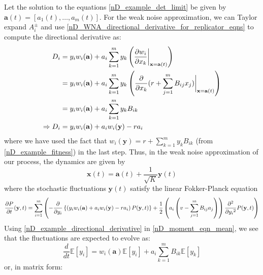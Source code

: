 Let the solution to the equations \eqref{nD_example_det_limit} be given by $\mathbf{a}(t) = [a_1(t),\ldots,a_m(t)]$. For the weak noise approximation, we can Taylor expand $A^{\pm}_i$ and use \eqref{nD_WNA_directional_derivative_for_replicator_eqns} to compute the directional derivative as:
\begin{align}
D_i &= y_iw_i(\mathbf{a}) + a_i\sum\limits_{k=1}^{m}y_k\left(\frac{\partial w_i}{\partial x_k}\bigg{|}_{\mathbf{x}=\mathbf{a}(t)}\right)\\
&= y_iw_i(\mathbf{a}) + a_i\sum\limits_{k=1}^{m}y_k\left(\frac{\partial}{\partial x_k}(r+\sum\limits_{j=1}^{m}B_{ij}x_j)\bigg{|}_{\mathbf{x}=\mathbf{a}(t)}\right)\\
&= y_iw_i(\mathbf{a}) + a_i\sum\limits_{k=1}^{m}y_kB_{ik}\\
\Rightarrow D_i &= y_iw_i(\mathbf{a}) + a_iw_i(\mathbf{y}) - ra_i\label{nD_example_directional_derivative}
\end{align}
where we have used the fact that $w_i(\mathbf{y}) = r + \sum\limits_{k=1}^{m}y_kB_{ik}$ (from \eqref{nD_example_fitness}) in the last step. Thus, in the weak noise approximation of our process, the dynamics are given by
\begin{equation}
\mathbf{x}(t) = \mathbf{a}(t) + \frac{1}{\sqrt{K}}\mathbf{y}(t)
\end{equation}
where the stochastic fluctuations $\mathbf{y}(t)$ satisfy the linear Fokker-Planck equation
\begin{equation}
\resizebox{1.1\textwidth}{!}{$\displaystyle\frac{\partial P}{\partial t}(\mathbf{y},t) = \sum\limits_{i=1}^{m}\left(-\frac{\partial}{\partial y_i}\left\{\left(y_iw_i(\mathbf{a}) + a_iw_i(\mathbf{y}) - ra_i\right)P(\mathbf{y},t)\right\}+\frac{1}{2}\left(a_i\left(v - \sum\limits_{j=1}^{m}B_{ij}a_j\right)\right)\frac{\partial^2}{\partial{y_i}^2}P(\mathbf{y},t)\right)$}
\end{equation}
Using \eqref{nD_example_directional_derivative} in \eqref{nD_moment_eqn_mean}, we see that the fluctuations are expected to evolve as:
\begin{equation}
\label{nD_example_moment_eqn_mean}
\frac{d}{dt}\mathbb{E}[y_i] = w_i(\mathbf{a})\mathbb{E}[y_i] + a_i\sum\limits_{k=1}^{m}B_{ik}\mathbb{E}[y_k]
\end{equation}
or, in matrix form:
